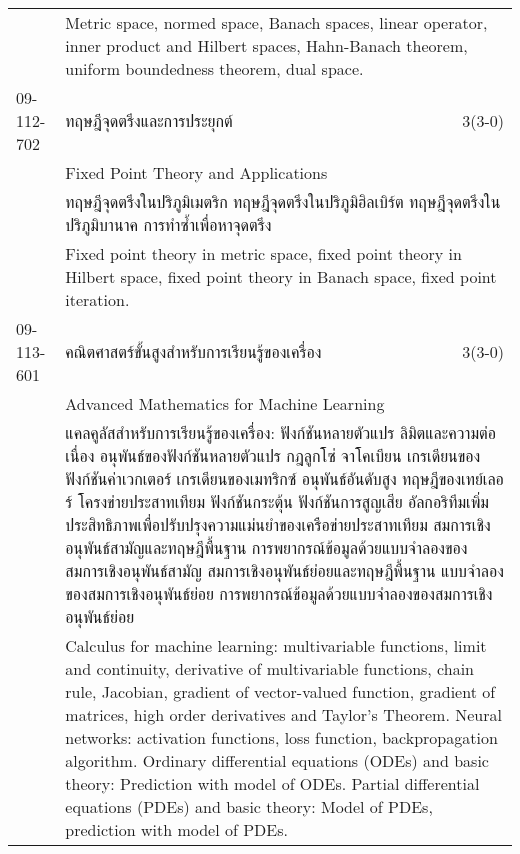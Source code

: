 \begin{longtable}{p{}p{}r{}}
&  \multicolumn{2}{p{0.75\textwidth}}{Metric space, normed space, Banach spaces, linear operator, inner product and Hilbert spaces, Hahn-Banach theorem, uniform boundedness theorem, dual space.} \vspace{8mm} \\*
09-112-702 & ทฤษฎีจุดตรึงและการประยุกต์ & 3(3-0)\\*
 & Fixed Point Theory and Applications & \phantom{x} \vspace{3mm} \\*
&  \multicolumn{2}{p{0.75\textwidth}}{ทฤษฎีจุดตรึงในปริภูมิเมตริก ทฤษฎีจุดตรึงในปริภูมิฮิลเบิร์ต ทฤษฎีจุดตรึงในปริภูมิบานาค การทำซ้ำเพื่อหาจุดตรึง} \vspace{3mm} \\*
&  \multicolumn{2}{p{0.75\textwidth}}{Fixed point theory in metric space, fixed point theory in Hilbert space, fixed point theory in Banach space, fixed point iteration.} \vspace{8mm} \\*
09-113-601 & คณิตศาสตร์ขั้นสูงสำหรับการเรียนรู้ของเครื่อง & 3(3-0)\\*
 & Advanced Mathematics for Machine Learning & \phantom{x} \vspace{3mm} \\*
&  \multicolumn{2}{p{0.75\textwidth}}{แคลคูลัสสำหรับการเรียนรู้ของเครื่อง: ฟังก์ชันหลายตัวแปร ลิมิตและความต่อเนื่อง อนุพันธ์ของฟังก์ชันหลายตัวแปร กฎลูกโซ่ จาโคเบียน เกรเดียนของฟังก์ชันค่าเวกเตอร์ เกรเดียนของเมทริกซ์ อนุพันธ์อันดับสูง ทฤษฎีของเทย์เลอร์ โครงข่ายประสาทเทียม ฟังก์ชันกระตุ้น ฟังก์ชันการสูญเสีย อัลกอริทึมเพิ่มประสิทธิภาพเพื่อปรับปรุงความแม่นยำของเครือข่ายประสาทเทียม สมการเชิงอนุพันธ์สามัญและทฤษฎีพื้นฐาน การพยากรณ์ข้อมูลด้วยแบบจำลองของสมการเชิงอนุพันธ์สามัญ สมการเชิงอนุพันธ์ย่อยและทฤษฎีพื้นฐาน แบบจำลองของสมการเชิงอนุพันธ์ย่อย การพยากรณ์ข้อมูลด้วยแบบจำลองของสมการเชิงอนุพันธ์ย่อย} \vspace{3mm} \\*
&  \multicolumn{2}{p{0.75\textwidth}}{Calculus for machine learning: multivariable functions, limit and continuity, derivative of multivariable functions, chain rule, Jacobian, gradient of vector-valued function, gradient of matrices, high order derivatives and Taylor’s Theorem. Neural networks: activation functions, loss function, backpropagation algorithm. Ordinary differential equations (ODEs) and basic theory: Prediction with model of ODEs. Partial differential equations (PDEs) and basic theory: Model of PDEs, prediction with model of PDEs.} \vspace{8mm} \\*

\end{longtable}
